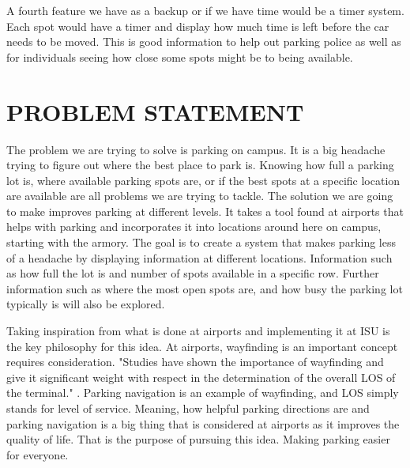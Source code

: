 \documentclass[12pt]{article}
\begin{document}
A fourth feature we have as a backup or if we have time would be a timer system. Each spot would have a timer and display how much time is left before the car needs to be moved. This is good information to help out parking police as well as for individuals seeing how close some spots might be to being available.





\section{PROBLEM STATEMENT}

The problem we are trying to solve is parking on campus. It is a big headache trying to figure out where the best place to park is. Knowing how full a parking lot is, where available parking spots are, or if the best spots at a specific location are available are all problems we are trying to tackle. The solution we are going to make improves parking at different levels. It takes a tool found at airports that helps with parking and incorporates it into locations around here on campus, starting with the armory. The goal is to create a system that makes parking less of a headache by displaying information at different locations. Information such as how full the lot is and number of spots available in a specific row. Further information such as where the most open spots are, and how busy the parking lot typically is will also be explored. 

Taking inspiration from what is done at airports and implementing it at ISU is the key philosophy for this idea. At airports, wayfinding is an important concept requires consideration. "Studies have shown the importance of wayfinding and give it significant weight with respect in the determination of the overall LOS of the terminal." \cite{Harding}. Parking navigation is an example of wayfinding, and LOS simply stands for level of service. Meaning, how helpful parking directions are and parking navigation is a big thing that is considered at airports as it improves the quality of life. That is the purpose of pursuing this idea. Making parking easier for everyone. 
\end{document}
